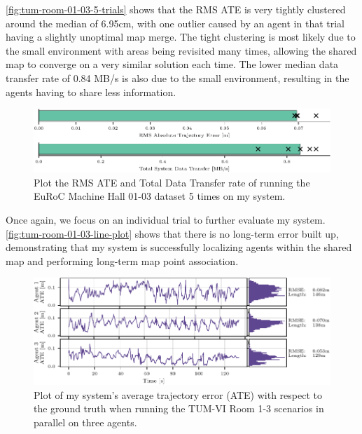 \autoref{fig:tum-room-01-03-5-trials} shows that the RMS ATE is very tightly clustered around the median of 6.95cm, with one outlier caused by an agent in that trial having a slightly unoptimal map merge. The tight clustering is most likely due to the small environment with areas being revisited many times, allowing the shared map to converge on a very similar solution each time. The lower median data transfer rate of 0.84 MB/s is also due to the small environment, resulting in the agents having to share less information.

\begin{figure}[h]
    \centering
    \includegraphics[width=\linewidth]{figures/comparison_apr11_tum_room_trajectory_a.pdf}

    \caption{Plot the RMS ATE and Total Data Transfer rate of running the EuRoC Machine Hall 01-03 dataset 5 times on my system.}
    \label{fig:tum-room-01-03-5-trials}
\end{figure}

Once again, we focus on an individual trial to further evaluate my system. \autoref{fig:tum-room-01-03-line-plot} shows that there is no long-term error built up, demonstrating that my system is successfully localizing agents within the shared map and performing long-term map point association.

\begin{figure}[h]
    \centering
    \includegraphics[width=\linewidth]{figures/apr11_tum_room_trajectory_a_line_plot.pdf}

    \caption{Plot of my system's average trajectory error (ATE) with respect to the ground truth when running the TUM-VI Room 1-3 scenarios in parallel on three agents.}
    \label{fig:tum-room-01-03-line-plot}
\end{figure}

